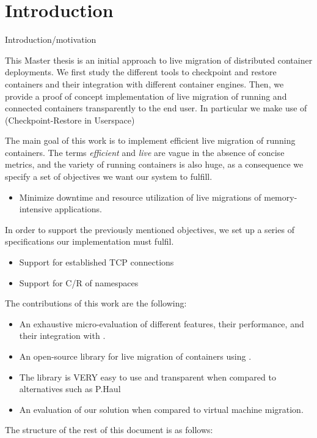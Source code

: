 \chapter{Introduction} \label{chap:introduction}


Introduction/motivation

This Master thesis is an initial approach to live migration of distributed container deployments.
We first study the different tools to checkpoint and restore containers and their integration with different container engines.
Then, we provide a proof of concept implementation of live migration of running and connected containers transparently to the end user.
In particular we make use of \criu (Checkpoint-Restore in Userspace) 

The main goal of this work is to implement efficient live migration of running containers.
The terms \textit{efficient} and \textit{live} are vague in the absence of concise metrics, and the variety of running containers is also huge, as a consequence we specify a set of objectives we want our system to fulfill.
\begin{itemize}
    \item Minimize downtime and resource utilization of live migrations of memory-intensive applications.
\end{itemize}

In order to support the previously mentioned objectives, we set up a series of specifications our implementation must fulfil.
\begin{itemize}
    \item Support for established TCP connections
    \item Support for C/R of namespaces
\end{itemize}

The contributions of this work are the following:
\begin{itemize}
    \item An exhaustive micro-evaluation of different \criu features, their performance, and their integration with \runc.
    \item An open-source library for live migration of \runc containers using \criu.
    \item The library is VERY easy to use and transparent when compared to alternatives such as P.Haul
    \item An evaluation of our solution when compared to virtual machine migration.
\end{itemize}

The structure of the rest of this document is as follows:
